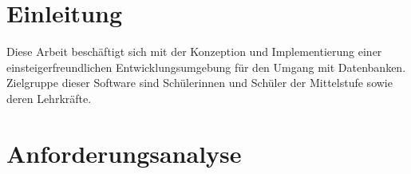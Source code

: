 \documentclass[paper=a4,fontsize=11pt,parskip=half]{scrartcl}
\title{\doctitle}
\subtitle{\docsubtitle}
\author{\docauthors}
\date{\today{}}
\begin{document}

\newpage{}

\tableofcontents{}
\newpage{}



\section{Einleitung}

Diese Arbeit beschäftigt sich mit der Konzeption und Implementierung einer einsteigerfreundlichen Entwicklungsumgebung für den Umgang mit Datenbanken. Zielgruppe dieser Software sind Schülerinnen und Schüler der Mittelstufe sowie deren Lehrkräfte.

\section{Anforderungsanalyse}
\end{document}
